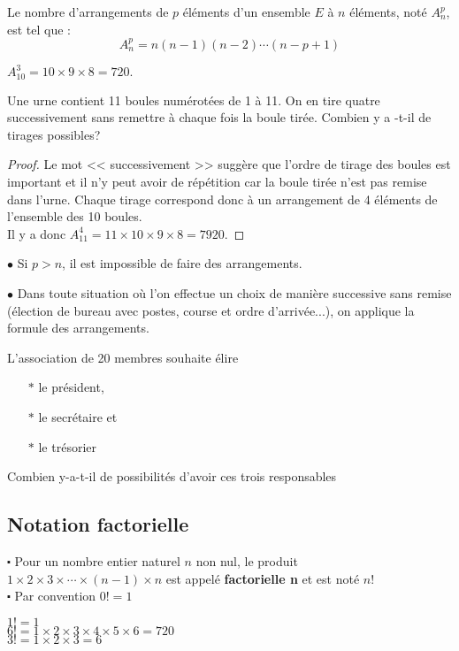 \begin{theorem}
Le nombre d'arrangements de $ p $ éléments  d'un ensemble $ E $ à $ n $ éléments,  noté  $ A_{n}^{p} $, est tel que :
\[  A_{n}^{p}= n(n-1)(n-2)\cdots (n-p+1)\]
\end{theorem}

\begin{example}
$A_{10}^{3} =10\times 9\times 8=720.  $
\end{example}

\begin{exercice}

 Une urne contient 11 boules numérotées de 1 à 11. On en tire quatre successivement sans  remettre à chaque fois la boule  tirée.  Combien y a -t-il de tirages  possibles? 
\end{exercice}
 \begin{proof}
 
  Le  mot << successivement >> suggère que l'ordre de tirage des boules est important et il n'y peut avoir de répétition car la boule tirée n'est pas remise dans l'urne. 
Chaque tirage correspond donc  à un arrangement de 4 éléments de l'ensemble des 10 boules.\\
Il y a donc $A_{11}^{4} =11\times 10\times 9 \times 8 =7920.  $
 \end{proof}
\begin{remark}
 
  $ \bullet $ Si $  p > n $, il est impossible de faire des arrangements.

$ \bullet $ Dans toute situation  où l'on effectue un choix de manière successive sans remise (élection de bureau avec postes, course et ordre d'arrivée...), on applique la formule des arrangements.
\end{remark}
 \begin{exercice}
L'association de 20 membres souhaite élire
\begin{itemize}
 \item[$  \ast$]   le président,
  \item[$  \ast$]  le secrétaire et
 \item[$  \ast$]    le trésorier
\end{itemize}
    Combien y-a-t-il de possibilités d'avoir ces trois responsables
   \end{exercice}
\subsection*{Notation factorielle}
$ \centerdot $ Pour un nombre  entier naturel $ n $ non nul, le produit $ 1\times 2\times 3\times \cdots \times (n-1)\times n  $ est appelé \textbf{factorielle n}  et est noté $n!$\\
$ \centerdot $ Par convention $ 0!=1 $
\begin{example}
$1!=1$\\
$6!=1\times 2\times 3\times 4\times 5 \times 6= 720$\\
$3!=1\times 2\times 3= 6$
\end{example}


